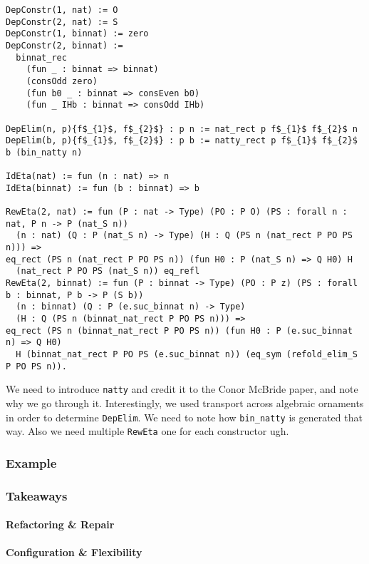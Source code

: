 \begin{lstlisting}
DepConstr(1, nat) := O 
DepConstr(2, nat) := S
DepConstr(1, binnat) := zero
DepConstr(2, binnat) :=
  binnat_rec
    (fun _ : binnat => binnat)
    (consOdd zero)
    (fun b0 _ : binnat => consEven b0)
    (fun _ IHb : binnat => consOdd IHb)

DepElim(n, p){f$_{1}$, f$_{2}$} : p n := nat_rect p f$_{1}$ f$_{2}$ n
DepElim(b, p){f$_{1}$, f$_{2}$} : p b := natty_rect p f$_{1}$ f$_{2}$ b (bin_natty n)

IdEta(nat) := fun (n : nat) => n
IdEta(binnat) := fun (b : binnat) => b

RewEta(2, nat) := fun (P : nat -> Type) (PO : P O) (PS : forall n : nat, P n -> P (nat_S n))
  (n : nat) (Q : P (nat_S n) -> Type) (H : Q (PS n (nat_rect P PO PS n))) =>
eq_rect (PS n (nat_rect P PO PS n)) (fun H0 : P (nat_S n) => Q H0) H
  (nat_rect P PO PS (nat_S n)) eq_refl
RewEta(2, binnat) := fun (P : binnat -> Type) (PO : P z) (PS : forall b : binnat, P b -> P (S b))
  (n : binnat) (Q : P (e.suc_binnat n) -> Type)
  (H : Q (PS n (binnat_nat_rect P PO PS n))) =>
eq_rect (PS n (binnat_nat_rect P PO PS n)) (fun H0 : P (e.suc_binnat n) => Q H0)
  H (binnat_nat_rect P PO PS (e.suc_binnat n)) (eq_sym (refold_elim_S P PO PS n)).
\end{lstlisting}
We need to introduce \lstinline{natty} and credit it to the Conor McBride paper,
and note why we go through it.
Interestingly, we used transport across algebraic ornaments in order to determine
\lstinline{DepElim}.
We need to note how \lstinline{bin_natty} is generated that way.
Also we need multiple \lstinline{RewEta} one for each constructor ugh.

\subsubsection{Example}

\subsubsection{Takeaways}

\paragraph{Refactoring \& Repair}

\paragraph{Configuration \& Flexibility}

